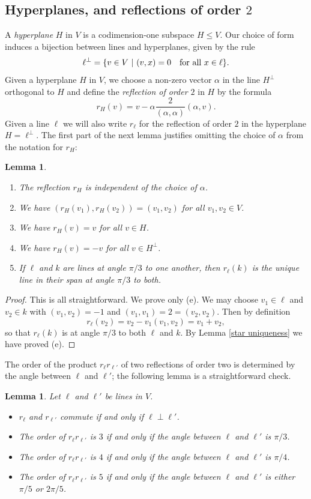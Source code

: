 \documentclass[11pt, reqno]{amsart}
\numberwithin{equation}{section}
\theoremstyle{definition}
\theoremstyle{plain}
\newtheorem{lemma}[theorem]{Lemma}
\begin{document}
\subsection{Hyperplanes, and reflections of order $2$}  A \emph{hyperplane} $H$ in $V$ is a codimension-one subspace $H \leq V$. Our choice of form induces a bijection between lines and hyperplanes, given by the rule
$$\ell^\perp=\{v \in V \ | \ (v,x)=0 \quad \hbox{for all $x \in \ell$} \}.$$ Given a hyperplane $H$ in $V$, we choose a non-zero vector $\alpha$ in the line $H^\perp$ orthogonal to $H$ and define the \emph{reflection of order $2$} in $H$ by the formula
$$r_H(v)=v-\alpha \frac{2}{(\alpha,\alpha)} (\alpha,v).$$ Given a line $\ell$ we will also write $r_\ell$ for the reflection of order $2$ in the hyperplane $H=\ell^\perp$. The first part of the next lemma justifies omitting the choice of $\alpha$ from the notation for $r_H$:
\begin{lemma} \label{reflections lemma}
\begin{enumerate}
\item[(a)] The reflection $r_H$ is independent of the choice of $\alpha$.
\item[(b)] We have $(r_H(v_1),r_H(v_2))=(v_1,v_2)$ for all $v_1,v_2 \in V$.
\item[(c)] We have $r_H(v)=v$ for all $v \in H$.
\item[(d)] We have $r_H(v)=-v$ for all $v \in H^\perp$. 
\item[(e)] If $\ell$ and $k$ are lines at angle $\pi/3$ to one another, then $r_\ell(k)$ is the unique line in their span at angle $\pi/3$ to both.
\end{enumerate}
\end{lemma} 
\begin{proof}
This is all straightforward. We prove only (e). We may choose $v_1 \in \ell$ and $v_2 \in k$ with $(v_1,v_2)=-1$ and $(v_1,v_1)=2=(v_2,v_2)$. Then by definition
$$r_\ell(v_2)=v_2-v_1(v_1,v_2)=v_1+v_2,$$ so that $r_\ell(k)$ is at angle $\pi/3$ to both $\ell$ and $k$. By Lemma \ref{star uniqueness} we have proved (e). 
\end{proof} 

The order of the product $r_\ell r_{\ell'}$ of two reflections of order two is determined by the angle between $\ell$ and $\ell'$; the following lemma is a straightforward check.
\begin{lemma} Let $\ell$ and $\ell'$ be lines in $V$.
\begin{itemize}
\item[(a)] $r_\ell$ and $r_{\ell'}$ commute if and only if $\ell \perp \ell'$.
\item[(b)] The order of $r_\ell r_{\ell'}$ is $3$ if and only if the angle between $\ell$ and $\ell'$ is $\pi/3$.
\item[(c)] The order of $r_\ell r_{\ell'}$ is $4$ if and only if the angle between $\ell$ and $\ell'$ is $\pi/4$.
\item[(d)] The order of $r_\ell r_{\ell'}$ is $5$ if and only if the angle between $\ell$ and $\ell'$ is either $\pi/5$ or $2 \pi /5$. 
\end{itemize}
\end{lemma}
\end{document}
